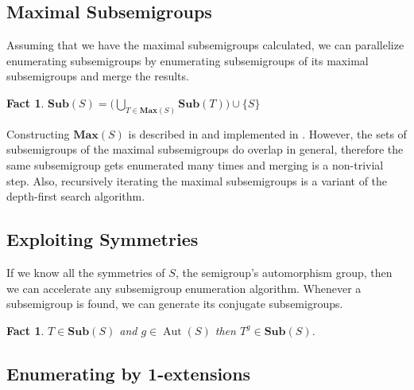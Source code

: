 \documentclass{amsart}
\newcommand{\Sub}{\mathbf{Sub}}
\newcommand{\Max}{\mathbf{Max}}
\DeclareMathOperator{\Aut}{Aut}
\theoremstyle{plain}
\newtheorem{fact}[theorem]{Fact}
\theoremstyle{definition}
\begin{document}
\subsection{Maximal Subsemigroups}
Assuming that we have the maximal subsemigroups calculated, we can parallelize enumerating subsemigroups by enumerating subsemigroups of its maximal subsemigroups and merge the results.
\begin{fact}
$\Sub(S)=\big( \bigcup_{T\in \Max(S)}\Sub(T)\big)\cup \{S\}$
\end{fact}
\noindent Constructing $\Max(S)$ is described in \cite{MaxSubSemi} and implemented in \cite{Semigroups}.
However, the sets of subsemigroups of the maximal subsemigroups do overlap in general, therefore the same subsemigroup gets enumerated many times and merging is a non-trivial step.
Also, recursively iterating the maximal subsemigroups is a variant of the depth-first search algorithm.  

\subsection{Exploiting Symmetries}
If we know all the symmetries of $S$, the semigroup's automorphism group, then we can accelerate any subsemigroup enumeration algorithm.
Whenever a subsemigroup is found, we can generate its conjugate subsemigroups.
\begin{fact}
$T\in\Sub(S)$ and $g\in \Aut(S)$ then $T^g\in\Sub(S)$.%
\end{fact}


\subsection{Enumerating by 1-extensions}
\end{document}
